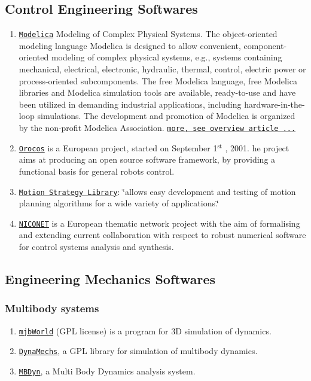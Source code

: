 \hypertarget{related_ces}{}\subsection{Control Engineering Softwares}\label{related_ces}
\begin{enumerate}
\item \href{http://www.modelica.org/}{\tt Modelica} Modeling of Complex Physical Systems. The object-oriented modeling language Modelica is designed to allow convenient, component-oriented modeling of complex physical systems, e.g., systems containing mechanical, electrical, electronic, hydraulic, thermal, control, electric power or process-oriented subcomponents. The free Modelica language, free Modelica libraries and Modelica simulation tools are available, ready-to-use and have been utilized in demanding industrial applications, including hardware-in-the-loop simulations. The development and promotion of Modelica is organized by the non-profit Modelica Association. \href{http://www.modelica.org/documents/ModelicaOverview14.pdf}{\tt more, see overview article ...}\item \href{http://www.orocos.org}{\tt Orocos} is a European project, started on September 1$^{\mbox{st}}$ , 2001. he project aims at producing an open source software framework, by providing a functional basis for general robots control.\item \href{http://msl.cs.uiuc.edu/msl/index.html}{\tt Motion Strategy Library}: \char`\"{}allows easy development and testing of motion planning algorithms for a wide variety of applications.\char`\"{}\item \href{http://www.win.tue.nl/niconet/}{\tt NICONET} is a European thematic network project with the aim of formalising and extending current collaboration with respect to robust numerical software for control systems analysis and synthesis.\end{enumerate}
\hypertarget{related_ems}{}\subsection{Engineering Mechanics Softwares}\label{related_ems}
\hypertarget{related_ems_1}{}\subsubsection{Multibody systems}\label{related_ems_1}
\begin{enumerate}
\item \href{http://www.martinb.com/}{\tt mjb\-World} (GPL license) is a program for 3D simulation of dynamics.\item \href{http://dynamechs.sourceforge.net/}{\tt Dyna\-Mechs}, a GPL library for simulation of multibody dynamics.\item \href{http://www.aero.polimi.it/projects/mbdyn/}{\tt MBDyn}, a Multi Body Dynamics analysis system.\end{enumerate}
